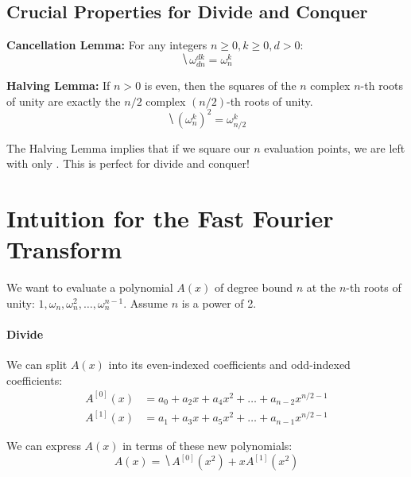 \documentclass[11  pt]{article}
\begin{document}
\vs{1cm}

\subsection{Crucial Properties for Divide and Conquer}

\begin{lemma}\textbf{Cancellation Lemma:} For any integers $n \geq 0, k \geq 0, d > 0$:
    \begin{equation*}
        \hide{\omega_{dn}^{dk} = \omega_n^k}
    \end{equation*}
\end{lemma}

\vs{1cm}

\begin{lemma}\textbf{Halving Lemma:} If $n > 0$ is even, then the squares of the $n$ complex $n$-th roots of unity are exactly the $n/2$ complex $(n/2)$-th roots of unity.
    \begin{equation*}
        \hide{(\omega_n^k)^2 = \omega_{n/2}^k}
    \end{equation*}
\end{lemma}

\vs{1cm}
The Halving Lemma implies that if we square our $n$ evaluation points, we are left with only . This is perfect for divide and conquer!

\newpage
\section{Intuition for the Fast Fourier Transform}

We want to evaluate a polynomial $A(x)$ of degree bound $n$ at the $n$-th roots of unity: $1, \omega_n, \omega_n^2, \hdots, \omega_n^{n-1}$. Assume $n$ is a power of 2.

\paragraph{Divide}
We can split $A(x)$ into its even-indexed coefficients and odd-indexed coefficients:
\begin{align*}
    A^{[0]}(x) &= a_0 + a_2 x + a_4 x^2 + \hdots + a_{n-2} x^{n/2 - 1} \\
    A^{[1]}(x) &= a_1 + a_3 x + a_5 x^2 + \hdots + a_{n-1} x^{n/2 - 1}
\end{align*}

We can express $A(x)$ in terms of these new polynomials:
\begin{equation*}
    A(x) = \hide{A^{[0]}(x^2) + x A^{[1]}(x^2)}
\end{equation*}
\end{document}
